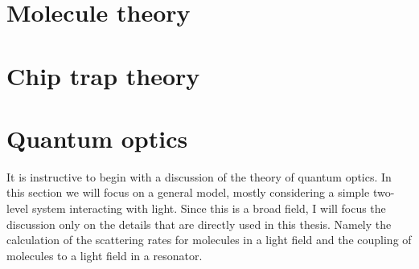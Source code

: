 
\section{Molecule theory}
\label{theory:molecules}


\section{Chip trap theory}
\label{theory:chips}


\section{Quantum optics}
\label{theory:QO}

It is instructive to begin with a discussion of the theory of quantum optics.
In this section we will focus on a general model, mostly considering a simple
two-level system interacting with light. Since this is a broad field, I will
focus the discussion only on the details that are directly used in this thesis.
Namely the calculation of the scattering rates for molecules in a light field
and the coupling of molecules to a light field in a resonator.


